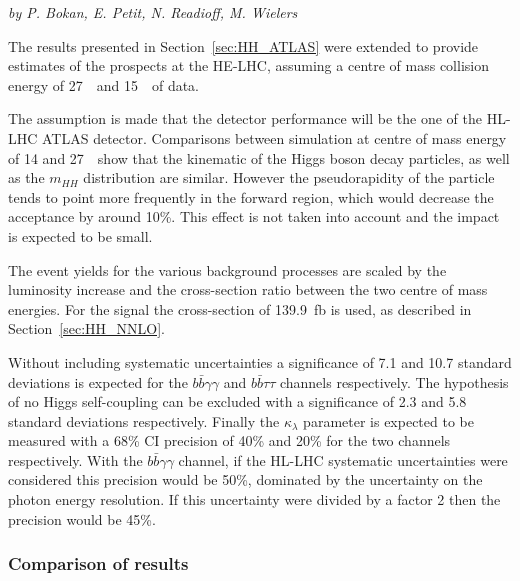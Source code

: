 \label{sec:HH_HE_atlas}
\begin{center}
\textit{by P. Bokan, E. Petit, N. Readioff, M. Wielers}
\end{center}

The results presented in Section~\ref{sec:HH_ATLAS} were extended to provide estimates of the prospects at the HE-LHC, assuming a centre of mass collision energy of 27~\TeV\ and 15~\abinv\ of data.

The assumption is made that the detector performance will be the one of the HL-LHC ATLAS detector. Comparisons between simulation at centre of mass energy of 14 and 27~\TeV\ show that the kinematic of the Higgs boson decay particles, as well as the $m_{HH}$ distribution are similar. However the pseudorapidity of the particle tends to point more frequently in the forward region, which would decrease the acceptance by around 10\%. This effect is not taken into account and the impact is expected to be small.

The event yields for the various background processes are scaled by the luminosity increase and the cross-section ratio between the two centre of mass energies. For the signal the cross-section of 139.9~fb is used, as described in Section~\ref{sec:HH_NNLO}.

Without including systematic uncertainties a significance of 7.1 and 10.7 standard deviations is expected for the $b\bar{b}\gamma\gamma$ and $b\bar{b}\tau\tau$ channels respectively.
The hypothesis of no Higgs self-coupling can be excluded with a significance of 2.3 and 5.8 standard deviations respectively. Finally the $\kappa_{\lambda}$ parameter is expected to be measured with a 68\% CI precision of 40\% and 20\% for the two channels respectively.
With the $b\bar{b}\gamma\gamma$ channel, if the HL-LHC systematic uncertainties were considered this precision would be 50\%, dominated by the uncertainty on the photon energy resolution. If this uncertainty were divided by a factor 2 then the precision would be 45\%.



\subsubsection{Comparison of results}


